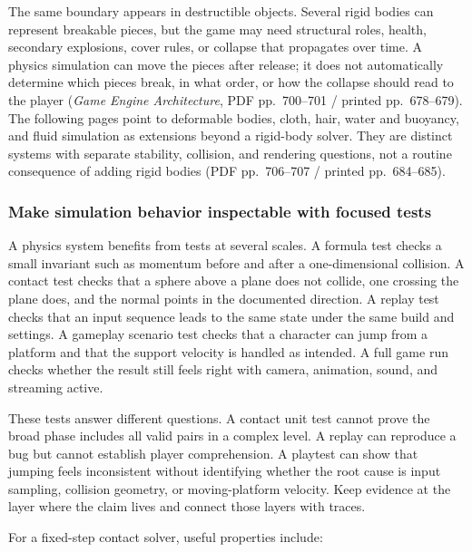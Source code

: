 The same boundary appears in destructible objects. Several rigid bodies can represent breakable pieces, but the game may need structural roles, health, secondary explosions, cover rules, or collapse that propagates over time. A physics simulation can move the pieces after release; it does not automatically determine which pieces break, in what order, or how the collapse should read to the player (\emph{Game Engine Architecture}, PDF pp.~700--701 / printed pp.~678--679). The following pages point to deformable bodies, cloth, hair, water and buoyancy, and fluid simulation as extensions beyond a rigid-body solver. They are distinct systems with separate stability, collision, and rendering questions, not a routine consequence of adding rigid bodies (PDF pp.~706--707 / printed pp.~684--685).

\subsubsection{Make simulation behavior inspectable with focused tests}\label{06-engine-ii-ch033-make-simulation-behavior-inspectable-with-focused-tests}

\hypertarget{06-engine-ii-ch033-make-simulation-behavior-inspectable-with-focused-tests}{}

A physics system benefits from tests at several scales. A formula test checks a small invariant such as momentum before and after a one-dimensional collision. A contact test checks that a sphere above a plane does not collide, one crossing the plane does, and the normal points in the documented direction. A replay test checks that an input sequence leads to the same state under the same build and settings. A gameplay scenario test checks that a character can jump from a platform and that the support velocity is handled as intended. A full game run checks whether the result still feels right with camera, animation, sound, and streaming active.

These tests answer different questions. A contact unit test cannot prove the broad phase includes all valid pairs in a complex level. A replay can reproduce a bug but cannot establish player comprehension. A playtest can show that jumping feels inconsistent without identifying whether the root cause is input sampling, collision geometry, or moving-platform velocity. Keep evidence at the layer where the claim lives and connect those layers with traces.

For a fixed-step contact solver, useful properties include:

